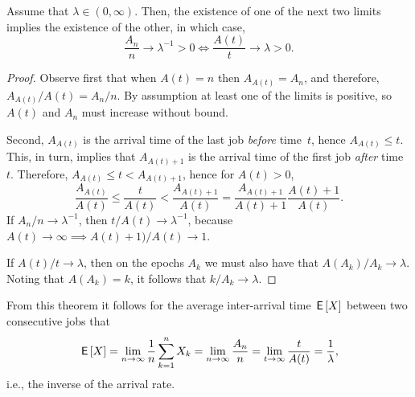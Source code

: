 \documentclass[stochastic-or.tex]{subfiles}
\begin{document}
\begin{theorem}
Assume that $\lambda \in (0, \infty)$. Then, the existence of one of the next two limits implies  the existence of the other, in which case,
\begin{equation*}
\frac{A_{n}}{n} \to \lambda^{-1}>0  \iff \frac{A(t)}{t} \to \lambda >0.
\end{equation*}
\end{theorem}
\begin{proof}
Observe first that when $A(t)= n$ then $A_{A(t)} = A_{n}$, and therefore, $A_{A(t)}/A(t) = A_n/n$.
By assumption at least one of the limits is positive,  so $A(t)$ and $A_{n}$ must increase without bound.

Second, $A_{A(t)}$ is the arrival time of the last job \emph{before} time~$t$, hence $A_{A(t)} \leq t$.
This, in turn, implies that $A_{A(t)+1}$ is the arrival time of the first job \emph{after} time~$t$.
Therefore, $A_{A(t)} \leq t < A_{A(t)+1}$, hence for $A(t)>0$,
\begin{equation*}
 \frac{A_{A(t)}} {A(t)} \leq \frac{t}{A(t)} <\frac{A_{A(t)+1}}{A(t)} = \frac{A_{A(t)+1}}{A(t)+1}\frac{A(t)+1}{A(t)}.
 \end{equation*}
If $A_n/n \to \lambda^{-1}$, then $t/A(t) \to \lambda^{-1}$, because $A(t) \to \infty \implies A(t)+1)/A(t) \to 1$.

If $A(t)/t \to \lambda$, then on the epochs $A_{k}$ we must also have that $A(A_k)/A_k \to \lambda$.
Noting that $A(A_{k}) = k$, it follows that $k/A_{k} \to \lambda$.
\end{proof}

From this theorem it follows for the average inter-arrival time $\,\mathsf{E}\left[X\right]$ between two consecutive jobs that
\begin{equation*}
 \,\mathsf{E}\left[X\right] = \lim_{n\to\infty} \frac{1}n\sum_{k=1}^n X_k = \lim_{n\to\infty} \frac{A_{n}}{n} = \lim_{t\to\infty} \frac t{A(t)} = \frac 1 \lambda,
\end{equation*}
i.e., the inverse of the arrival rate.
\end{document}
